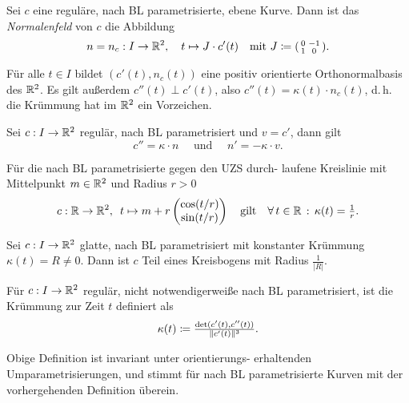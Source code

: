 \documentclass{cheat-sheet}
\begin{document}
\begin{defn}
  Sei $c$ eine reguläre, nach BL parametrisierte, ebene Kurve. Dann ist das \emph{Normalenfeld} von $c$ die Abbildung
  \[ n = n_c : I \to \mathbb{R}^2, \quad t \mapsto J \cdot c'(t) \quad \text{mit } J \coloneqq (\begin{smallmatrix} 0 & -1 \\ 1 & 0 \end{smallmatrix}).  \]
  
\end{defn}

\begin{bem}
  Für alle $t \in I$ bildet $(c'(t), n_c(t))$ eine positiv orientierte Orthonormalbasis des $\mathbb{R}^2$.
  Es gilt außerdem $c''(t) \perp c'(t)$, also $c''(t) = \kappa(t) \cdot n_c(t)$, d.\,h. die Krümmung hat im $\mathbb{R}^2$ ein Vorzeichen.
\end{bem}

\begin{satz}
  Sei $c : I \to \mathbb{R}^2$ regulär, nach BL parametrisiert und $v = c'$, dann gilt
  \[ c'' = \kappa \cdot n \quad \text{ und } \quad n' = -\kappa \cdot v. \]
\end{satz}


\begin{bsp}
  Für die nach BL parametrisierte gegen den UZS durch- laufene Kreislinie mit Mittelpunkt $m \in \mathbb{R}^2$ und Radius $r > 0$
  \[
    c : \mathbb{R} \to \mathbb{R}^2, \enspace t \mapsto m + r \begin{pmatrix} \cos(t/r) \\ \sin(t/r) \end{pmatrix}
    \quad \text{gilt} \quad
    \forall \, {t \in \mathbb{R}} \,:\, \kappa(t) = \tfrac{1}{r}.
  \]
\end{bsp}

\begin{satz}
  Sei $c : I \to \mathbb{R}^2$ glatte, nach BL parametrisiert mit konstanter Krümmung $\kappa(t) = R \not= 0$. Dann ist $c$ Teil eines Kreisbogens mit Radius $\tfrac{1}{|R|}$.
\end{satz}

\begin{defn}
  Für $c : I \to \mathbb{R}^2$ regulär, nicht notwendigerweiße nach BL parametrisiert, ist die Krümmung zur Zeit $t$ definiert als
  \[ \kappa(t) \coloneqq \tfrac{\det(c'(t), c''(t))}{\lVert c'(t)\rVert^3}. \]
\end{defn}

\begin{bem}
  Obige Definition ist invariant unter orientierungs- erhaltenden Umparametrisierungen, und stimmt für nach BL parametrisierte Kurven mit der vorhergehenden Definition überein.
\end{bem}
\end{document}
